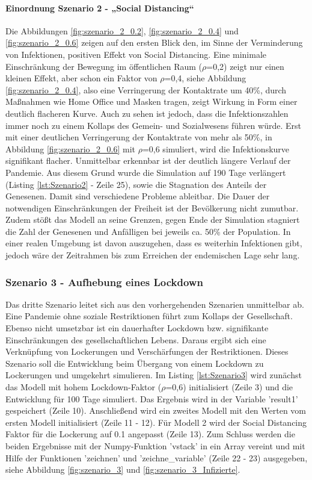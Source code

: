 \documentclass[12pt]{article}
\begin{document}
\paragraph{Einordnung Szenario 2 - „Social Distancing“}
Die Abbildungen \ref{fig:szenario_2_0.2}, \ref{fig:szenario_2_0.4} und \ref{fig:szenario_2_0.6} zeigen auf den ersten Blick den, im Sinne der Verminderung von Infektionen, positiven Effekt von Social Distancing. Eine minimale Einschränkung der Bewegung im öffentlichen Raum ($\rho$=0,2) zeigt nur einen kleinen Effekt, aber schon ein Faktor von $\rho$=0,4, siehe Abbildung \ref{fig:szenario_2_0.4}, also eine Verringerung der Kontaktrate um 40\%, durch Maßnahmen wie Home Office und Masken tragen, zeigt Wirkung in Form einer deutlich flacheren Kurve. Auch zu sehen ist jedoch, dass die Infektionszahlen immer noch zu einem Kollaps des Gemein- und Sozialwesens führen würde. Erst mit einer deutlichen Verringerung der Kontaktrate von mehr als 50\%, in Abbildung \ref{fig:szenario_2_0.6} mit $\rho$=0,6 simuliert, wird die Infektionskurve signifikant flacher. Unmittelbar erkennbar ist der deutlich längere Verlauf der Pandemie. Aus diesem Grund wurde die Simulation auf 190 Tage verlängert (Listing \ref{lst:Szenario2} - Zeile 25), sowie die Stagnation des Anteils der Genesenen. Damit sind verschiedene Probleme ableitbar. Die Dauer der notwendigen Einschränkungen der Freiheit ist der Bevölkerung nicht zumutbar. Zudem stößt das Modell an seine Grenzen, gegen Ende der Simulation stagniert die Zahl der Genesenen und Anfälligen bei jeweils ca. 50\% der Population. In einer realen Umgebung ist davon auszugehen, dass es weiterhin Infektionen gibt, jedoch wäre der Zeitrahmen bis zum Erreichen der endemischen Lage sehr lang.

\subsubsection{Szenario 3 - Aufhebung eines Lockdown}
Das dritte Szenario leitet sich aus den vorhergehenden Szenarien unmittelbar ab. Eine Pandemie ohne soziale Restriktionen führt zum Kollaps der Gesellschaft. Ebenso nicht umsetzbar ist ein dauerhafter Lockdown bzw. signifikante Einschränkungen des gesellschaftlichen Lebens. Daraus ergibt sich eine Verknüpfung von Lockerungen und Verschärfungen der Restriktionen. Dieses Szenario soll die Entwicklung beim Übergang von einem Lockdown zu Lockerungen und umgekehrt simulieren. Im Listing \ref{lst:Szenario3} wird zunächst das Modell mit hohem Lockdown-Faktor ($\rho$=0,6) initialisiert (Zeile 3) und die Entwicklung für 100 Tage simuliert. Das Ergebnis wird in der Variable 'result1' gespeichert (Zeile 10). Anschließend wird ein zweites Modell mit den Werten vom ersten Modell initialisiert (Zeile 11 - 12). Für Modell 2 wird der Social Distancing Faktor für die Lockerung auf 0.1 angepasst (Zeile 13). Zum Schluss werden die beiden Ergebnisse mit der Numpy-Funktion 'vstack' in ein Array vereint und mit Hilfe der Funktionen 'zeichnen' und 'zeichne\_variable' (Zeile 22 - 23) ausgegeben, siehe Abbildung \ref{fig:szenario_3} und \ref{fig:szenario_3_Infizierte}.
\end{document}
